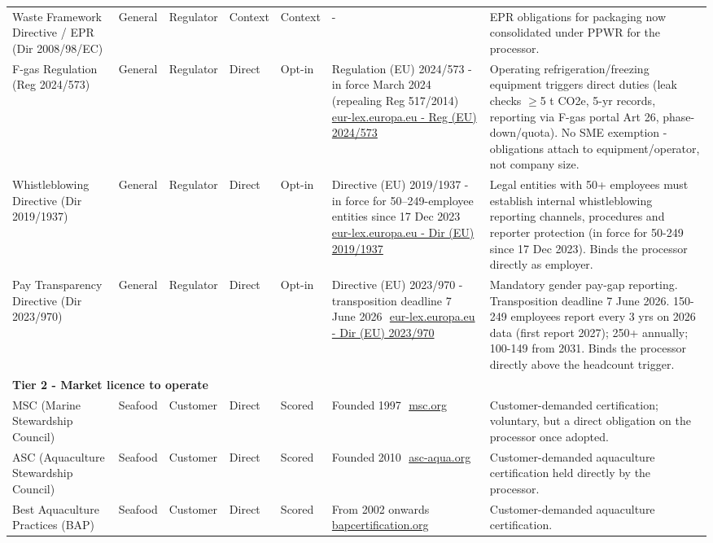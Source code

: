\begin{landscape}
\begin{longtable}{p{2.9cm}p{1.2cm}p{1.3cm}p{1.2cm}p{1.4cm}p{3.2cm}p{5.9cm}}
Waste Framework Directive / EPR (Dir 2008/98/EC) & General & Regulator & Context & Context & - & EPR obligations for packaging now consolidated under PPWR for the processor. \\
F-gas Regulation (Reg 2024/573) & General & Regulator & Direct & Opt-in & Regulation (EU) 2024/573 - in force March 2024 (repealing Reg 517/2014)~\,\href{https://eur-lex.europa.eu/eli/reg/2024/573/oj}{eur-lex.europa.eu - Reg (EU) 2024/573} & Operating refrigeration/freezing equipment triggers direct duties (leak checks $\geq$5 t CO2e, 5-yr records, reporting via F-gas portal Art 26, phase-down/quota). No SME exemption - obligations attach to equipment/operator, not company size. \\
Whistleblowing Directive (Dir 2019/1937) & General & Regulator & Direct & Opt-in & Directive (EU) 2019/1937 - in force for 50--249-employee entities since 17 Dec 2023~\,\href{https://eur-lex.europa.eu/eli/dir/2019/1937/oj}{eur-lex.europa.eu - Dir (EU) 2019/1937} & Legal entities with 50+ employees must establish internal whistleblowing reporting channels, procedures and reporter protection (in force for 50-249 since 17 Dec 2023). Binds the processor directly as employer. \\
Pay Transparency Directive (Dir 2023/970) & General & Regulator & Direct & Opt-in & Directive (EU) 2023/970 - transposition deadline 7 June 2026~\,\href{https://eur-lex.europa.eu/eli/dir/2023/970/oj}{eur-lex.europa.eu - Dir (EU) 2023/970} & Mandatory gender pay-gap reporting. Transposition deadline 7 June 2026. 150-249 employees report every 3 yrs on 2026 data (first report 2027); 250+ annually; 100-149 from 2031. Binds the processor directly above the headcount trigger. \\
\multicolumn{7}{l}{\rule{0pt}{1.1em}\textbf{Tier 2 - Market licence to operate}}\\[1pt]
MSC (Marine Stewardship Council) & Seafood & Customer & Direct & Scored & Founded 1997~\,\href{https://www.msc.org}{msc.org} & Customer-demanded certification; voluntary, but a direct obligation on the processor once adopted. \\
ASC (Aquaculture Stewardship Council) & Seafood & Customer & Direct & Scored & Founded 2010~\,\href{https://asc-aqua.org}{asc-aqua.org} & Customer-demanded aquaculture certification held directly by the processor. \\
Best Aquaculture Practices (BAP) & Seafood & Customer & Direct & Scored & From 2002 onwards~\,\href{https://www.bapcertification.org}{bapcertification.org} & Customer-demanded aquaculture certification. \\

\end{longtable}
\end{landscape}

